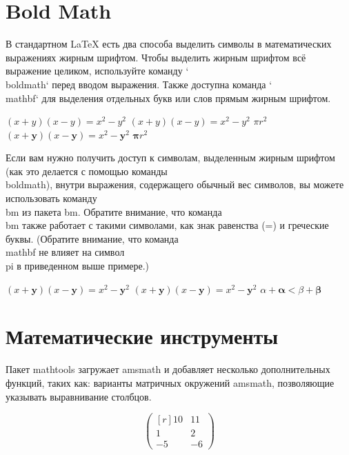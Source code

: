 \documentclass[leqno]{article}
\begin{document}
  \section{Bold Math}
  \label{sec:bold}

  В стандартном LaTeX есть два способа выделить символы в математических выражениях жирным шрифтом. 
  Чтобы выделить жирным шрифтом всё выражение целиком, используйте команду `\\boldmath` перед вводом выражения. 
  Также доступна команда `\\mathbf` для выделения отдельных букв или слов прямым жирным шрифтом.

  \begin{center}
    $(x+y)(x-y)=x^{2}-y^{2}$
    {\boldmath $(x+y)(x-y)=x^{2}-y^{2}$ $\pi r^2$}
    $(x+\mathbf{y})(x-\mathbf{y})=x^{2}-{\mathbf{y}}^{2}$
    $\mathbf{\pi} r^2$ %
  \end{center}

  \smallskip


  Если вам нужно получить доступ к символам, выделенным жирным шрифтом (как это делается с помощью команды \\boldmath), 
  внутри выражения, содержащего обычный вес символов, вы можете использовать команду \\bm из пакета bm. Обратите внимание, 
  что команда \\bm также работает с такими символами, как знак равенства (=) и греческие буквы.
  (Обратите внимание, что команда \\mathbf не влияет на символ \\pi в приведенном выше примере.)


  \begin{center}
    $(x+\mathbf{y})(x-\mathbf{y})=x^{2}-{\mathbf{y}}^{2}$
    $(x+\bm{y})(x-\bm{y}) \bm{=} x^{2}-{\bm{y}}^{2}$
    $\alpha + \bm{\alpha} < \beta + \bm{\beta}$
  \end{center}




  \section{Математические инструменты}
  \label{sec:tools}

  Пакет mathtools загружает amsmath и добавляет несколько дополнительных функций, таких как:
  варианты матричных окружений amsmath, позволяющие указывать выравнивание столбцов.

  \begin{center}
    \[
    \begin{pmatrix*}[r]
    10&11\\
    1&2\\
    -5&-6
    \end{pmatrix*}
    \]
  \end{center}
\end{document}

